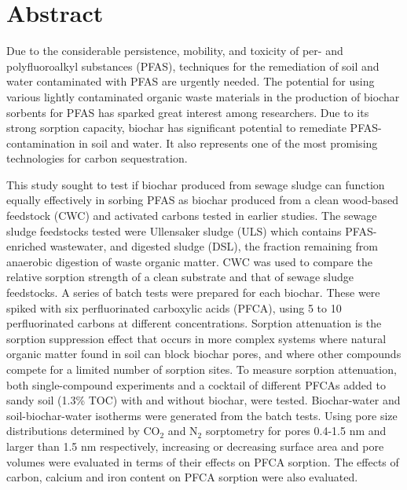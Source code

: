 \newpage
{}
\section*{Abstract}
Due to the considerable persistence, mobility, and toxicity of per- and polyfluoroalkyl substances (PFAS), techniques for the remediation of soil and water contaminated with PFAS are urgently needed. The potential for using various lightly contaminated organic waste materials in the production of biochar sorbents for PFAS has sparked great interest among researchers. Due to its strong sorption capacity, biochar has significant potential to remediate PFAS-contamination in soil and water. It also represents one of the most promising technologies for carbon sequestration.

This study sought to test if biochar produced from sewage sludge can function equally effectively in sorbing PFAS as biochar produced from a clean wood-based feedstock (CWC) and activated carbons tested in earlier studies. The sewage sludge feedstocks tested were Ullensaker sludge (ULS) which contains PFAS-enriched wastewater, and digested sludge (DSL), the fraction remaining from anaerobic digestion of waste organic matter. CWC was used to compare the relative sorption strength of a clean substrate and that of sewage sludge feedstocks. A series of batch tests were prepared for each biochar. These were spiked with six perfluorinated carboxylic acids (PFCA), using 5 to 10 perfluorinated carbons at different concentrations. Sorption attenuation is the sorption suppression effect that occurs in more complex systems where natural organic matter found in soil can block biochar pores, and where other compounds compete for a limited number of sorption sites. To measure sorption attenuation, both single-compound experiments and a cocktail of different PFCAs added to sandy soil (1.3\% TOC) with and without biochar, were tested. Biochar-water and soil-biochar-water isotherms were generated from the batch tests. Using  pore size distributions determined by $\mathrm{CO_2}$ and $\mathrm{N_2}$ sorptometry for pores 0.4-1.5 nm and larger than 1.5 nm respectively, increasing or decreasing surface area and pore volumes were evaluated in terms of their effects on PFCA sorption. The effects of carbon, calcium and iron content on PFCA sorption were also evaluated.

